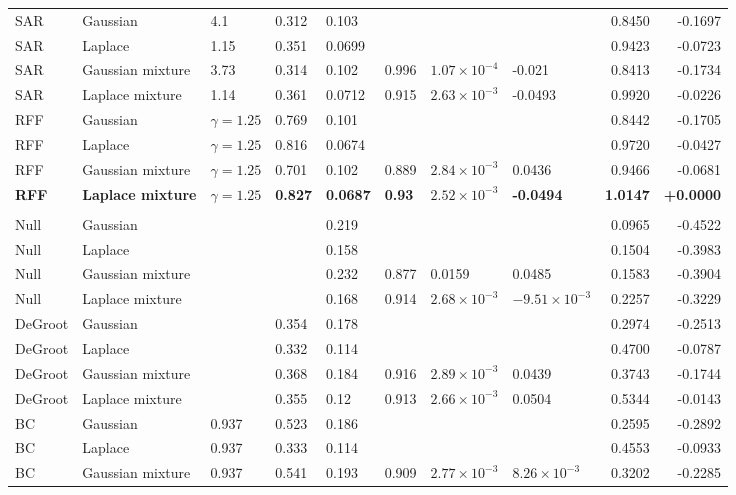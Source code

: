 \begin{longtable}{llllllllrr}
SAR & Gaussian & 4.1 & 0.312 & 0.103 &  &  &  & 0.8450 & -0.1697 \\
SAR & Laplace & 1.15 & 0.351 & 0.0699 &  &  &  & 0.9423 & -0.0723 \\
SAR & Gaussian mixture & 3.73 & 0.314 & 0.102 & 0.996 & $1.07\times10^{-4}$ & -0.021 & 0.8413 & -0.1734 \\
SAR & Laplace mixture & 1.14 & 0.361 & 0.0712 & 0.915 & $2.63\times10^{-3}$ & -0.0493 & 0.9920 & -0.0226 \\
RFF & Gaussian & $\gamma=1.25$ & 0.769 & 0.101 &  &  &  & 0.8442 & -0.1705 \\
RFF & Laplace & $\gamma=1.25$ & 0.816 & 0.0674 &  &  &  & 0.9720 & -0.0427 \\
RFF & Gaussian mixture & $\gamma=1.25$ & 0.701 & 0.102 & 0.889 & $2.84\times10^{-3}$ & 0.0436 & 0.9466 & -0.0681 \\
\textbf{RFF} & \textbf{Laplace mixture} & \textbf{$\gamma=1.25$} & \textbf{0.827} & \textbf{0.0687} & \textbf{0.93} & \textbf{$2.52\times10^{-3}$} & \textbf{-0.0494} & \textbf{1.0147} & \textbf{+0.0000} \\
\midrule
\multicolumn{10}{l}{\takacsOne{}} \\
Null & Gaussian &  &  & 0.219 &  &  &  & 0.0965 & -0.4522 \\
Null & Laplace &  &  & 0.158 &  &  &  & 0.1504 & -0.3983 \\
Null & Gaussian mixture &  &  & 0.232 & 0.877 & 0.0159 & 0.0485 & 0.1583 & -0.3904 \\
Null & Laplace mixture &  &  & 0.168 & 0.914 & $2.68\times10^{-3}$ & $-9.51\times10^{-3}$ & 0.2257 & -0.3229 \\
DeGroot & Gaussian &  & 0.354 & 0.178 &  &  &  & 0.2974 & -0.2513 \\
DeGroot & Laplace &  & 0.332 & 0.114 &  &  &  & 0.4700 & -0.0787 \\
DeGroot & Gaussian mixture &  & 0.368 & 0.184 & 0.916 & $2.89\times10^{-3}$ & 0.0439 & 0.3743 & -0.1744 \\
DeGroot & Laplace mixture &  & 0.355 & 0.12 & 0.913 & $2.66\times10^{-3}$ & 0.0504 & 0.5344 & -0.0143 \\
BC & Gaussian & 0.937 & 0.523 & 0.186 &  &  &  & 0.2595 & -0.2892 \\
BC & Laplace & 0.937 & 0.333 & 0.114 &  &  &  & 0.4553 & -0.0933 \\
BC & Gaussian mixture & 0.937 & 0.541 & 0.193 & 0.909 & $2.77\times10^{-3}$ & $8.26\times10^{-3}$ & 0.3202 & -0.2285 \\

\end{longtable}
